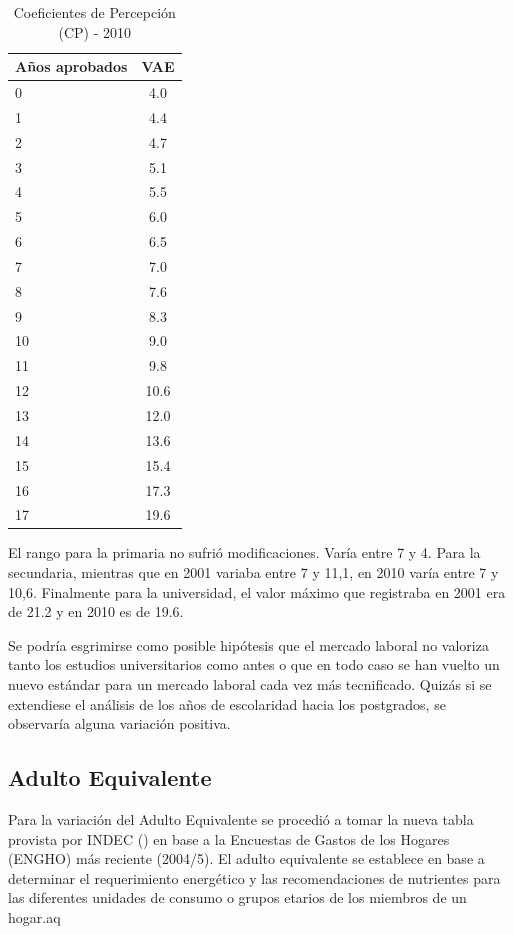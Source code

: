 \begin{table}[h!]
	\centering
	\caption{Coeficientes de Percepción (CP) - 2010}
	\label{tab:tableCP}
	\begin{tabular}{l|c}
		Años aprobados & VAE \\
		\hline
		\hline
		0 & 4.0 \\
		1 & 4.4\\
		2 & 4.7 \\
		3 & 5.1 \\
		4 & 5.5 \\
		5 & 6.0 \\
		6 & 6.5 \\
		7 & 7.0 \\
		8 & 7.6 \\
		9 & 8.3 \\
		10 & 9.0  \\
		11 & 9.8 \\
		12 & 10.6 \\
		13 & 12.0 \\
		14 & 13.6 \\
		15 & 15.4\\
		16 & 17.3 \\
		17 &  19.6\\		
	\end{tabular}
\end{table}



El rango para la primaria no sufrió modificaciones. Varía entre 7 y 4. Para la secundaria, mientras que en 2001 variaba entre 7 y 11,1, en 2010 varía entre 7 y 10,6. Finalmente para la universidad, el valor máximo que registraba en 2001 era de 21.2 y en 2010 es de 19.6.

Se podría esgrimirse como posible hipótesis que el mercado laboral no valoriza tanto los estudios universitarios como antes o que en todo caso se han vuelto un nuevo estándar para un mercado laboral cada vez más tecnificado. Quizás si se extendiese el análisis de los años de escolaridad hacia los postgrados, se observaría alguna variación positiva.

\subsection{Adulto Equivalente}

Para la variación del Adulto Equivalente se procedió a tomar la nueva tabla provista por INDEC (\cite{indec2016b}) en base a la Encuestas de Gastos de los Hogares (ENGHO) más reciente (2004/5). El adulto equivalente se establece en base a determinar el requerimiento energético y las recomendaciones de nutrientes para las diferentes unidades de consumo o grupos etarios de los miembros de un hogar.aq



